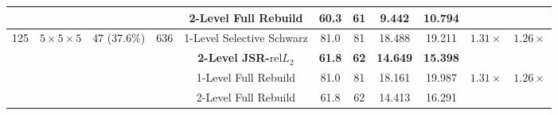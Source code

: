 \documentclass[preprint,12pt,3p]{elsarticle}
\begin{document}
\begin{table}[htbp]
{\begin{tabular}{ccccccccccc}
& & & & 2-Level Full Rebuild & 60.3 & 61 & 9.442 & 10.794 & & \\
\midrule
\multirow{4}{*}{125} & \multirow{4}{*}{$5\times 5\times 5$} & \multirow{4}{*}{$47$ ($37.6\%$)} & \multirow{4}{*}{$636$} 
& 1-Level Selective Schwarz & 81.0 & 81 & 18.488 & 19.211 & \multirow{2}{*}{$\mathbf{1.31\times}$} & \multirow{2}{*}{$\mathbf{1.26\times}$} \\
& & & & \textbf{2-Level JSR-$\text{rel}L_2$} & \textbf{61.8} & \textbf{62} & \textbf{14.649} & \textbf{15.398} & & \\
& & & & 1-Level Full Rebuild & 81.0 & 81 & 18.161 & 19.987 & \multirow{2}{*}{$1.31\times$} & \multirow{2}{*}{$1.26\times$} \\
& & & & 2-Level Full Rebuild & 61.8 & 62 & 14.413 & 16.291 & & \\
\bottomrule
\end{tabular}%
}
\end{table}
\end{document}
